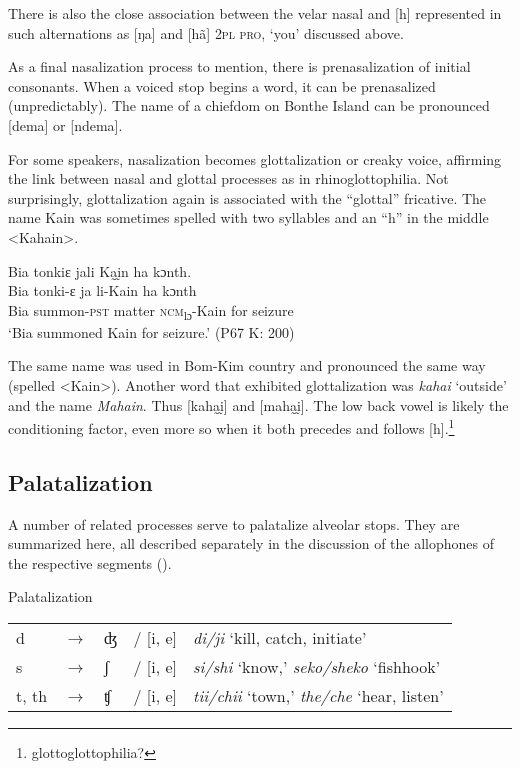 There is also the close association between the velar nasal and [h] represented in such alternations as [ŋa] and [hã] \textsc{2pl} \textsc{pro}, ‘you' discussed above.

As a final nasalization process to mention, there is prenasalization of initial consonants. When a voiced stop begins a word, it can be prenasalized (unpredictably). The name of a chiefdom on Bonthe Island can be pronounced [dema] or [ndema].

For some speakers, nasalization becomes glottalization or creaky voice, affirming the link between nasal and glottal processes as in rhinoglottophilia. Not surprisingly, glottalization again is associated with the “glottal” fricative. The name Kain was sometimes spelled with two syllables and an “h” in the middle <Kahain>.

\ea%
    \label{ex:39}
     Bia tonkiɛ jali Ka̰ḭn ha kɔnth.\\
    \gll Bia  tonki-ɛ        ja      li-Kain      ha    kɔnth\\
    Bia  summon-\textsc{pst}    matter  \textsc{ncm}\textsubscript{lɔ}{}-Kain    for    seizure\\
    \glt ‘Bia summoned Kain for seizure.' (P67 K: 200)
\z

The same name was used in Bom-Kim country and pronounced the same way (spelled <Kain>). Another word that exhibited glottalization was \textit{kahai} ‘outside' and the name \textit{Mahain}. Thus [kaha̰ḭ] and [maha̰ḭ]. The low back vowel is likely the conditioning factor, even more so when it both precedes and follows [h].\footnote{glottoglottophilia?}

\subsection{Palatalization}
\label{sec:2.4.3}
A number of related processes serve to palatalize alveolar stops. They are summarized here, all described separately in the discussion of the allophones of the respective segments ().

\ea%
\label{ex:40} Palatalization\\

\begin{tabular}{lllll}
d & $\xrightarrow{}$ & ʤ & / {\longrule} [i, e] & \textit{di/ji}  ‘kill, catch, initiate'\\
s & $\xrightarrow{}$ & ʃ & / {\longrule} [i, e] & \textit{si/shi}  ‘know,' \textit{seko/sheko} ‘fishhook'\\
t, th & $\xrightarrow{}$ & ʧ & / {\longrule} [i, e] & \textit{tii/chii} ‘town,' \textit{the/che} ‘hear, listen' 
\end{tabular}
\z

